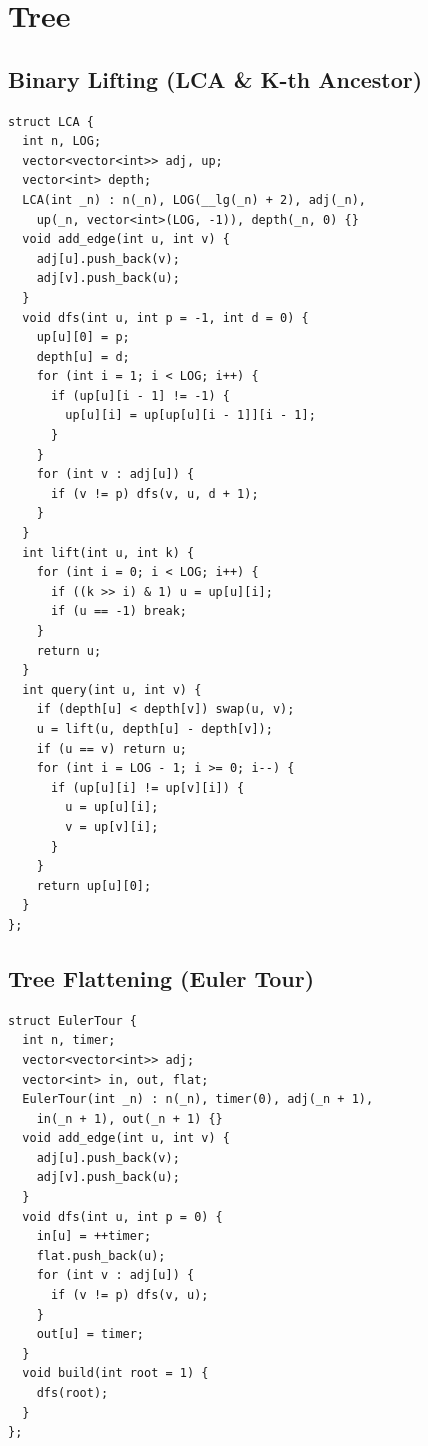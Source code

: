 \section{Tree}
\subsection{Binary Lifting (LCA \texorpdfstring{\&}{\&} K-th Ancestor)}
\begin{verbatim}
struct LCA {
  int n, LOG;
  vector<vector<int>> adj, up;
  vector<int> depth;
  LCA(int _n) : n(_n), LOG(__lg(_n) + 2), adj(_n),
    up(_n, vector<int>(LOG, -1)), depth(_n, 0) {}
  void add_edge(int u, int v) {
    adj[u].push_back(v);
    adj[v].push_back(u);
  }
  void dfs(int u, int p = -1, int d = 0) {
    up[u][0] = p;
    depth[u] = d;
    for (int i = 1; i < LOG; i++) {
      if (up[u][i - 1] != -1) {
        up[u][i] = up[up[u][i - 1]][i - 1];
      }
    }
    for (int v : adj[u]) {
      if (v != p) dfs(v, u, d + 1);
    }
  }
  int lift(int u, int k) {
    for (int i = 0; i < LOG; i++) {
      if ((k >> i) & 1) u = up[u][i];
      if (u == -1) break;
    }
    return u;
  }
  int query(int u, int v) {
    if (depth[u] < depth[v]) swap(u, v);
    u = lift(u, depth[u] - depth[v]);
    if (u == v) return u;
    for (int i = LOG - 1; i >= 0; i--) {
      if (up[u][i] != up[v][i]) {
        u = up[u][i];
        v = up[v][i];
      }
    }
    return up[u][0];
  }
};
\end{verbatim}
\subsection{Tree Flattening (Euler Tour)}
\begin{verbatim}
struct EulerTour {
  int n, timer;
  vector<vector<int>> adj;
  vector<int> in, out, flat;
  EulerTour(int _n) : n(_n), timer(0), adj(_n + 1),
    in(_n + 1), out(_n + 1) {}
  void add_edge(int u, int v) {
    adj[u].push_back(v);
    adj[v].push_back(u);
  }
  void dfs(int u, int p = 0) {
    in[u] = ++timer;
    flat.push_back(u);
    for (int v : adj[u]) {
      if (v != p) dfs(v, u);
    }
    out[u] = timer;
  }
  void build(int root = 1) {
    dfs(root);
  }
};
\end{verbatim}
